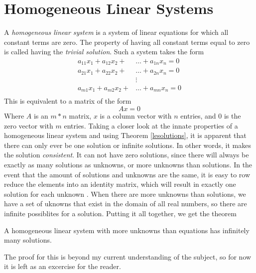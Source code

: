 \section{Homogeneous Linear Systems}
A \emph{homogeneous linear system} is a system of linear equations for which all
constant terms are zero. The property of having all constant terms equal to zero
is called having the \emph{trivial solution}.  Such a system takes the form 
\begin{equation}\label{homogeneousls}
    \begin{split}
        a_{11}x_1 + a_{12}x_2+&\ldots+a_{1n}x_n  = 0\\
        a_{21}x_1 + a_{22}x_2+&\ldots+a_{2n}x_n  = 0\\
                              &\vdots\\
        a_{m1}x_1 + a_{m2}x_2+&\ldots+a_{mn}x_n  = 0\\
    \end{split}
\end{equation}
This is equivalent to a matrix of the form 
\begin{equation}
    Ax = 0
\end{equation}
Where $A$ is an $m*n$ matrix, $x$ is a column vector with $n$ entries, and $0$
is the zero vector with $m$ entries. Taking a closer look at the innate
properties of a  homogeneous linear system and using Theorem \ref{lesolutions},
it is apparent that there can only ever be one solution or infinite solutions.
In other words, it makes the solution \emph{consistent}. It can not have zero
solutions, since there will always be exactly as many solutions as unknowns, or
more unknowns than solutions. In the event that the amount of solutions and
unknowns are the same, it is easy to row reduce the elements into an identity
matrix, which will result in exactly one solution for each unknown . When there
are more unknowns than solutions, we have a set of uknowns that exist in the
domain of all real numbers, so there are infinite possiblites for a solution.
Putting it all together, we get the theorem
\begin{theorem}\label{infsolutions}
    A homogeneous linear system with more unknowns than equations has infinitely
    many solutions.
\end{theorem}
The proof for this is beyond my current understanding of the subject, so for now
it is left as an excercise for the reader.

